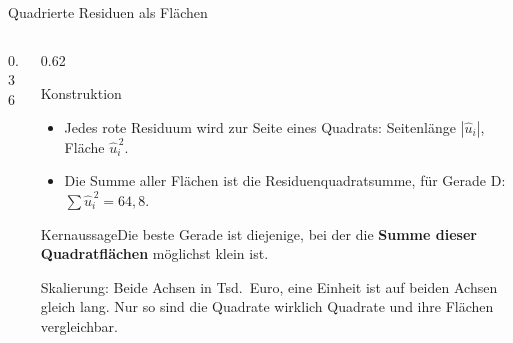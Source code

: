 \documentclass[aspectratio=169,11pt]{beamer}
\newcommand{\kernaussage}[1]{\begin{alertblock}{Kernaussage}#1\end{alertblock}}
\def\werbelist{1/33,3/30,4/37,5/33,6/38,8/41,8/39,9/43,10/45,11/40,12/42,13/47}
\newcommand{\werbepunkte}{\addplot[only marks, mark=*, mark size=2.2pt, color=hsbiblue]
  coordinates {(1,33) (3,30) (4,37) (5,33) (6,38) (8,41) (8,39) (9,43) (10,45) (11,40) (12,42) (13,47)};}
\newcommand{\residuenvon}[4]{%
  \foreach \px/\py in #1 {%
    \pgfmathsetmacro{\yh}{#2 + #3*\px}%
    \edef\tmpdraw{\noexpand\draw[#4] (axis cs:\px,\py) -- (axis cs:\px,\yh);}%
    \tmpdraw
  }}
\newcommand{\quadratevon}[4]{%
  \foreach \px/\py in #1 {%
    \pgfmathsetmacro{\yh}{#2 + #3*\px}%
    \pgfmathsetmacro{\ur}{abs(\py - \yh)}%
    \pgfmathsetmacro{\pxr}{\px + \ur}%
    \edef\tmpdraw{\noexpand\draw[#4] (axis cs:\px,\yh) rectangle (axis cs:\pxr,\py);}%
    \tmpdraw
  }}
\begin{document}
\begin{frame}{Quadrierte Residuen als Flächen}
  \begin{columns}[T]
    \begin{column}{0.36\textwidth}
      \begin{center}
      \end{center}
    \end{column}
    \begin{column}{0.62\textwidth}
      \small
      \begin{block}{Konstruktion}
        \begin{itemize}
          \item Jedes rote Residuum wird zur Seite eines Quadrats:
                Seitenlänge $|\hat{u}_i|$, Fläche $\hat{u}_i^{\,2}$.
          \item Die Summe aller Flächen ist die Residuenquadratsumme,
                für Gerade D: $\sum \hat{u}_i^{\,2} = 64{,}8$.
        \end{itemize}
      \end{block}
      \kernaussage{Die beste Gerade ist diejenige, bei der die
        \textbf{Summe dieser Quadratflächen} möglichst klein ist.}
      \footnotesize Skalierung: Beide Achsen in Tsd.\ Euro, eine Einheit ist auf
      beiden Achsen gleich lang. Nur so sind die Quadrate wirklich Quadrate und
      ihre Flächen vergleichbar.
    \end{column}
  \end{columns}
\end{frame}
\end{document}
